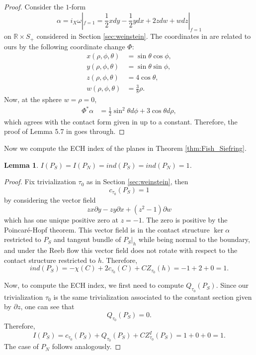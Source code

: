 \documentclass{article}
\numberwithin{equation}{section}
\newtheorem{lemma}[theorem]{Lemma}
\theoremstyle{definition}
\newcommand{\R}{\mathbb{R}}
\begin{document}
\begin{proof}
Consider the $1$-form 
$$\alpha = i_X \omega|_{f=1} = \frac{1}{2}xdy - \frac{1}{2}ydx + 2zdw + wdz|_{f=1}$$ 
on $\R \times S_+$ considered in Section \ref{sec:weinstein}. The coordinates in \cite{Fish_Siefring} are related to ours by the following coordinate change $\Phi$:
    \begin{align*}
        x(\rho, \phi, \theta) &= \sin \theta \cos \phi, \\
        y(\rho, \phi, \theta) &= \sin \theta \sin \phi, \\
        z(\rho, \phi, \theta) &= 4 \cos \theta, \\
        w(\rho, \phi, \theta) &= \frac{3}{8}\rho.
    \end{align*}
    Now, at the sphere $w=\rho=0$,
    \begin{align}
        \Phi^* \alpha &=\frac{1}{2}\sin^2 \theta d\phi + 3 \cos \theta d\rho,
    \end{align}
which agrees with the contact form given in \cite{Fish_Siefring} up to a constant. Therefore, the proof of Lemma 5.7 in \cite{Fish_Siefring} goes through.
\end{proof}


Now we compute the ECH index of the planes in Theorem \ref{thm:Fish_Siefring}.
\begin{lemma}
\label{lem:index_I_1}
$I(P_S) = I(P_N) = ind(P_S) = ind(P_N) = 1$.
\end{lemma}
\begin{proof}
Fix trivialization $\tau_{0}$ as in Section \ref{sec:weinstein}, then $$c_{\tau_0}(P_S) = 1$$ 
by considering the vector field $$zx \partial y - zy \partial x + (z^2-1) \partial w$$
which has one unique positive zero at $z=-1$. The zero is positive by the Poincar\'e-Hopf theorem. This vector field is in the contact structure $\ker \alpha$ restricted to $P_S$ and tangent bundle of $P_S|_h$ while being normal to the boundary, and under the Reeb flow this vector field does not rotate with respect to the contact structure restricted to $h$. Therefore,
$$ind(P_S) = -\chi(C) + 2c_{\tau_{0}}(C) + CZ_{\tau_{0}}(h) = -1+2+0 = 1.$$

Now, to compute the ECH index, we first need to compute $Q_{\tau_0}(P_S)$. Since our trivialization $\tau_0$ is the same trivialization associated to the constant section given by $\partial z$, one can see that 
$$Q_{\tau_0}(P_S) = 0.$$ 
Therefore, 
$$I(P_S) = c_{\tau_0}(P_S) + Q_{\tau_0}(P_S) + CZ^I_{\tau_0}(P_S) = 1 + 0 + 0 = 1.$$
The case of $P_N$ follows analogously.
\end{proof}
\end{document}
